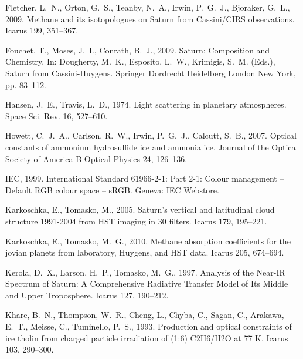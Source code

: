 \documentclass[article,11pt]{emulateapj}
\begin{document}
\begin{thebibliography}{85}
{Fletcher}, L.~N., {Orton}, G.~S., {Teanby}, N.~A., {Irwin}, P.~G.~J.,
  {Bjoraker}, G.~L., 2009{}. {Methane and its isotopologues on
  Saturn from Cassini/CIRS observations}. Icarus 199, 351--367.

{Fouchet}, T., {Moses}, J.~I., {Conrath}, B.~J., 2009. {Saturn: Composition and
  Chemistry}. In: {Dougherty}, M.~K., {Esposito}, L.~W., {Krimigis}, S.~M.
  (Eds.), Saturn from Cassini-Huygens. Springer Dordrecht Heidelberg London New
  York, pp. 83--112.

{Hansen}, J.~E., {Travis}, L.~D., 1974. {Light scattering in planetary
  atmospheres}. Space Sci. Rev. 16, 527--610.

{Howett}, C.~J.~A., {Carlson}, R.~W., {Irwin}, P.~G.~J., {Calcutt}, S.~B.,
  2007. {Optical constants of ammonium hydrosulfide ice and ammonia ice}.
  Journal of the Optical Society of America B Optical Physics 24, 126--136.

{IEC}, 1999. {International Standard 61966-2-1: Part 2-1: Colour management --
  Default RGB colour space -- sRGB}. Geneva: IEC Webstore.

{Karkoschka}, E., {Tomasko}, M., 2005. {Saturn's vertical and latitudinal cloud
  structure 1991-2004 from HST imaging in 30 filters}. Icarus 179, 195--221.

{Karkoschka}, E., {Tomasko}, M.~G., 2010. {Methane absorption coefficients for
  the jovian planets from laboratory, Huygens, and HST data}. Icarus 205,
  674--694.

{Kerola}, D.~X., {Larson}, H.~P., {Tomasko}, M.~G., 1997. {Analysis of the
  Near-IR Spectrum of Saturn: A Comprehensive Radiative Transfer Model of Its
  Middle and Upper Troposphere}. Icarus 127, 190--212.

{Khare}, B.~N., {Thompson}, W.~R., {Cheng}, L., {Chyba}, C., {Sagan}, C.,
  {Arakawa}, E.~T., {Meisse}, C., {Tuminello}, P.~S., 1993. {Production and
  optical constraints of ice tholin from charged particle irradiation of (1:6)
  C2H6/H2O at 77 K}. Icarus 103, 290--300.


\end{thebibliography}
\end{document}
